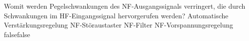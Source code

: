     {Womit werden Pegelschwankungen des NF-Ausgangssignals verringert, die durch Schwankungen im HF-Eingangssignal hervorgerufen werden?}
    {Automatische Verstärkungsregelung}
    {NF-Störaustaster}
    {NF-Filter}
    {NF-Vorspannungsregelung}
    {false}{false}
